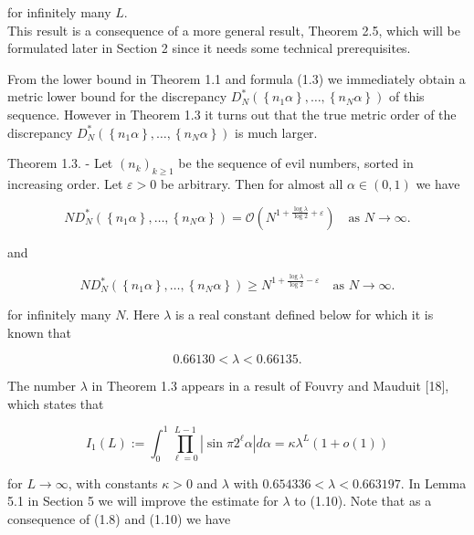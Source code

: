 \documentclass[10pt]{article}
\newcommand{\1}{\mathbf{1}}
\begin{document}
for infinitely many $L$.\\
This result is a consequence of a more general result, Theorem 2.5, which will be formulated later in Section 2 since it needs some technical prerequisites.

From the lower bound in Theorem 1.1 and formula (1.3) we immediately obtain a metric lower bound for the discrepancy $D_{N}^{*}\left(\left\{n_{1} \alpha\right\}, \ldots,\left\{n_{N} \alpha\right\}\right)$ of this sequence. However in Theorem 1.3 it turns out that the true metric order of the discrepancy $D_{N}^{*}\left(\left\{n_{1} \alpha\right\}, \ldots,\left\{n_{N} \alpha\right\}\right)$ is much larger.

Theorem 1.3. - Let $\left(n_{k}\right)_{k \geqslant 1}$ be the sequence of evil numbers, sorted in increasing order. Let $\varepsilon>0$ be arbitrary. Then for almost all $\alpha \in(0,1)$ we have


\begin{equation*}
N D_{N}^{*}\left(\left\{n_{1} \alpha\right\}, \ldots,\left\{n_{N} \alpha\right\}\right)=\mathcal{O}\left(N^{1+\frac{\log \lambda}{\log 2}+\varepsilon}\right) \quad\text{as }N\rightarrow\infty. \tag{1.8}
\end{equation*}


and


\begin{equation*}
N D_{N}^{*}\left(\left\{n_{1} \alpha\right\}, \ldots,\left\{n_{N} \alpha\right\}\right) \geqslant N^{1+\frac{\log\lambda}{\log2}-\varepsilon}\quad\text{as }N\rightarrow\infty. \tag{1.9}
\end{equation*}


for infinitely many $N$. Here $\lambda$ is a real constant defined below for which it is known that


\begin{equation*}
0.66130<\lambda<0.66135 . \tag{1.10}
\end{equation*}


The number $\lambda$ in Theorem 1.3 appears in a result of Fouvry and Mauduit [18], which states that


\begin{equation*}
I_{1}(L):=\int_{0}^{1} \prod_{\ell=0}^{L-1}\left|\sin \pi 2^{\ell} \alpha\right| d \alpha=\kappa \lambda^{L}(1+o(1)) \tag{1.11}
\end{equation*}


for $L \rightarrow \infty$, with constants $\kappa>0$ and $\lambda$ with $0.654336<\lambda<0.663197$. In Lemma 5.1 in Section 5 we will improve the estimate for $\lambda$ to (1.10). Note that as a consequence of (1.8) and (1.10) we have
\end{document}
